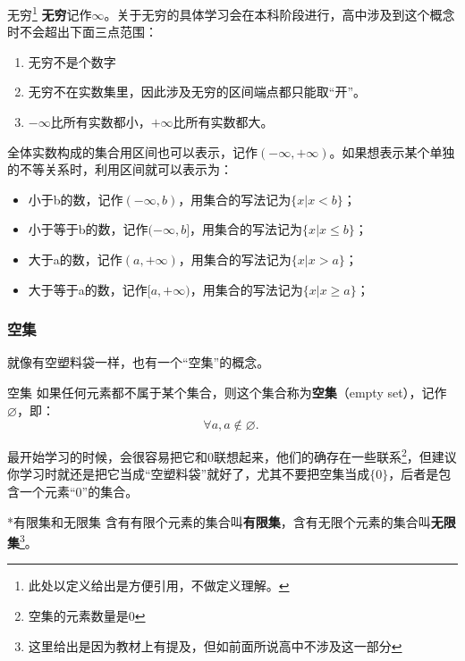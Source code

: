 \begin{definition}{无穷\footnote{此处以定义给出是方便引用，不做定义理解。}}
\textbf{无穷}记作$\infty$。关于无穷的具体学习会在本科阶段进行，高中涉及到这个概念时不会超出下面三点范围：
\begin{enumerate}
\item 无穷不是个数字
\item 无穷不在实数集里，因此涉及无穷的区间端点都只能取“开”。
\item $-\infty$比所有实数都小，$+\infty$比所有实数都大。
\end{enumerate}
\end{definition}

全体实数构成的集合用区间也可以表示，记作$(-\infty,+\infty)$。如果想表示某个单独的不等关系时，利用区间就可以表示为：
\begin{itemize}
\item 小于b的数，记作$(-\infty,b)$，用集合的写法记为$\{x|x< b\}$；
\item 小于等于b的数，记作$(-\infty,b]$，用集合的写法记为$\{x|x\leq b\}$；
\item 大于a的数，记作$(a,+\infty)$，用集合的写法记为$\{x|x> a\}$；
\item 大于等于a的数，记作$[a,+\infty)$，用集合的写法记为$\{x|x\geq a\}$；
\end{itemize}

\subsubsection{空集}

就像有空塑料袋一样，也有一个“空集”的概念。

\begin{definition}{空集}
如果任何元素都不属于某个集合，则这个集合称为\textbf{空集}（empty set），记作 $\varnothing$，即：
\begin{equation}
\forall a,a\notin\varnothing.~
\end{equation}
\end{definition}

最开始学习的时候，会很容易把它和$0$联想起来，他们的确存在一些联系\footnote{空集的元素数量是0}，但建议你学习时就还是把它当成“空塑料袋”就好了，尤其不要把空集当成$\{0\}$，后者是包含一个元素“$0$”的集合。

\begin{definition}{*有限集和无限集}
含有有限个元素的集合叫\textbf{有限集}，含有无限个元素的集合叫\textbf{无限集}\footnote{这里给出是因为教材上有提及，但如前面所说高中不涉及这一部分}。
\end{definition}

